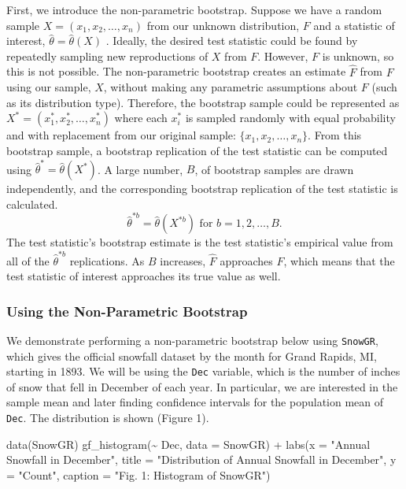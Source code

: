 \documentclass[12pt]{article}
\newenvironment{Shaded}{\begin{snugshade}}{\end{snugshade}}
\newcommand{\AttributeTok}[1]{\textcolor[rgb]{0.77,0.63,0.00}{#1}}
\newcommand{\FunctionTok}[1]{\textcolor[rgb]{0.00,0.00,0.00}{#1}}
\newcommand{\NormalTok}[1]{#1}
\newcommand{\SpecialCharTok}[1]{\textcolor[rgb]{0.00,0.00,0.00}{#1}}
\newcommand{\StringTok}[1]{\textcolor[rgb]{0.31,0.60,0.02}{#1}}
\begin{document}
First, we introduce the non-parametric bootstrap. Suppose we have a
random sample \(X = (x_1,x_2,\dots,x_n)\) from our unknown distribution,
\(F\) and a statistic of interest, \(\hat{\theta} = \hat{\theta}(X)\)
\citep{EfronCasi}. Ideally, the desired test statistic could be found by
repeatedly sampling new reproductions of \(X\) from \(F\). However,
\(F\) is unknown, so this is not possible. The non-parametric bootstrap
creates an estimate \(\hat{F}\) from \(F\) using our sample, \(X\),
without making any parametric assumptions about \(F\) (such as its
distribution type). Therefore, the bootstrap sample could be represented
as \(X^* = (x^*_1, x^*_2, \dots, x^*_n)\) where each \(x^*_i\) is
sampled randomly with equal probability and with replacement from our
original sample: \(\{x_1,x_2,\dots,x_n\}\). From this bootstrap sample,
a bootstrap replication of the test statistic can be computed using
\(\hat{\theta}^* = \hat{\theta}(X^*)\). A large number, \(B\), of
bootstrap samples are drawn independently, and the corresponding
bootstrap replication of the test statistic is calculated.
\[\hat{\theta}^{*b} = \hat{\theta}(X^{*b}) \text{ for } b = 1,2, \dots, B.\]
The test statistic's bootstrap estimate is the test statistic's
empirical value from all of the \(\hat{\theta}^{*b}\) replications. As
\(B\) increases, \(\hat{F}\) approaches \(F\), which means that the test
statistic of interest approaches its true value as well.

\hypertarget{using-the-non-parametric-bootstrap}{%
\subsubsection{Using the Non-Parametric
Bootstrap}\label{using-the-non-parametric-bootstrap}}

We demonstrate performing a non-parametric bootstrap below using
\texttt{SnowGR}, which gives the official snowfall dataset by the month
for Grand Rapids, MI, starting in 1893. We will be using the
\texttt{Dec} variable, which is the number of inches of snow that fell
in December of each year. In particular, we are interested in the sample
mean and later finding confidence intervals for the population mean of
\texttt{Dec}. The distribution is shown (Figure 1).

\begin{Shaded}
\begin{Highlighting}[]
\FunctionTok{data}\NormalTok{(SnowGR)}
\FunctionTok{gf\_histogram}\NormalTok{(}\SpecialCharTok{\textasciitilde{}}\NormalTok{ Dec, }\AttributeTok{data =}\NormalTok{ SnowGR) }\SpecialCharTok{+}
  \FunctionTok{labs}\NormalTok{(}\AttributeTok{x =} \StringTok{"Annual Snowfall in December"}\NormalTok{, }
       \AttributeTok{title =} \StringTok{"Distribution of Annual Snowfall in December"}\NormalTok{, }\AttributeTok{y =} \StringTok{"Count"}\NormalTok{,}
       \AttributeTok{caption =} \StringTok{"Fig. 1: Histogram of SnowGR"}\NormalTok{)}
\end{Highlighting}
\end{Shaded}
\end{document}
